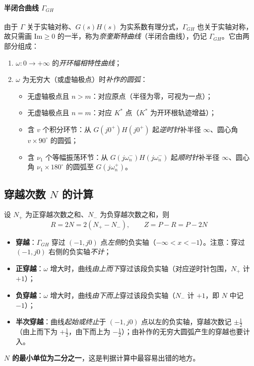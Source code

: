 \paragraph{半闭合曲线 $\Gamma_{GH}$}
由于 $\Gamma$ 关于实轴对称、$G(s)H(s)$ 为实系数有理分式，$\Gamma_{GH}$ 也关于实轴对称，故只需画 $\mathrm{Im}\ge0$ 的一半，称为\emph{奈奎斯特曲线}（半闭合曲线），仍记 $\Gamma_{GH}$。它由两部分组成：
\begin{enumerate}
    \item $\omega:0\to+\infty$ 的\emph{开环幅相特性曲线}；
    \item $\omega$ 为无穷大（或虚轴极点）时\emph{补作的圆弧}：
    \begin{itemize}
        \item 无虚轴极点且 $n>m$：对应原点（半径为零，可视为一点）；
        \item 无虚轴极点且 $n=m$：对应 $K^*$ 点（$K^*$ 为开环根轨迹增益）；
        \item 含 $v$ 个积分环节：从 $G(j0^+)H(j0^+)$ 起\emph{逆时针}补半径 $\infty$、圆心角 $v\times90^\circ$ 的圆弧；
        \item 含 $\nu_1$ 个等幅振荡环节：从 $G(j\omega_n^-)H(j\omega_n^-)$ 起\emph{顺时针}补半径 $\infty$、圆心角 $\nu_1\times180^\circ$ 的圆弧至 $G(j\omega_n^+)$。
    \end{itemize}
\end{enumerate}

\subsection{穿越次数 $N$ 的计算}
设 $N_+$ 为正穿越次数之和、$N_-$ 为负穿越次数之和，则
\[
R=2N=2(N_+-N_-),\qquad Z=P-R=P-2N
\]
\begin{itemize}
    \item \textbf{穿越}：$\Gamma_{GH}$ 穿过 $(-1,j0)$ 点\emph{左侧}的负实轴（$-\infty<x<-1$）。注意：穿过 $(-1,j0)$ 右侧的负实轴\emph{不计}；
    \item \textbf{正穿越}：$\omega$ 增大时，曲线\emph{由上而下}穿过该段负实轴（对应逆时针包围，$N_+$ 计 $+1$）；
    \item \textbf{负穿越}：$\omega$ 增大时，曲线\emph{由下而上}穿过该段负实轴（$N_-$ 计 $+1$，即 $N$ 中记 $-1$）；
    \item \textbf{半次穿越}：曲线\emph{起始或终止}于 $(-1,j0)$ 点以左的负实轴，穿越次数记 $\pm\frac12$（由上而下为 $+\frac12$，由下而上为 $-\frac12$）；由补作的无穷大圆弧产生的穿越也要计入。
\end{itemize}
\textbf{$N$ 的最小单位为二分之一}，这是判据计算中最容易出错的地方。

